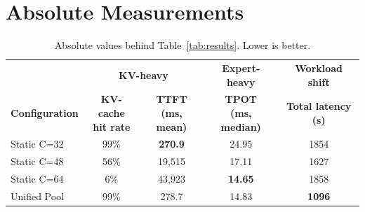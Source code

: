 %
%

\section{Absolute Measurements}
\label{app:absolute}

\begin{table}[h]
\centering
\caption{Absolute values behind Table~\ref{tab:results}. Lower is better.}
\label{tab:absolute}
\small
\begin{tabular}{l cc c c}
\toprule
& \multicolumn{2}{c}{\textbf{KV-heavy}} &
\multicolumn{1}{c}{\textbf{Expert-heavy}} &
\multicolumn{1}{c}{\textbf{Workload shift}} \\
\cmidrule(lr){2-3}\cmidrule(lr){4-4}\cmidrule(l){5-5}
\textbf{Configuration} &
\shortstack{\textbf{KV-cache}\\\textbf{hit rate}} &
\shortstack{\textbf{TTFT}\\\textbf{(ms, mean)}} &
\shortstack{\textbf{TPOT}\\\textbf{(ms, median)}} &
\shortstack{\textbf{Total latency}\\\textbf{(s)}} \\
\midrule
Static C=32 & 99\% & \textbf{270.9} & 24.95 & 1854 \\
Static C=48 & 56\%  & 19{,}515 & 17.11 & 1627 \\
Static C=64 & 6\%   & 43{,}923 & \textbf{14.65} & 1858 \\
\midrule
Unified Pool & 99\% & 278.7 & 14.83 & \textbf{1096} \\
\bottomrule
\end{tabular}
\end{table}
